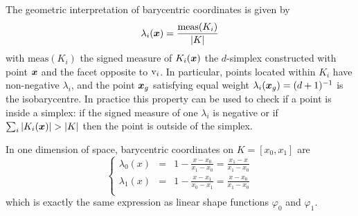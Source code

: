 The geometric interpretation of barycentric coordinates is given by
\[
\displaystyle\lambda_i({{\boldsymbol x}}) = \frac{\mathrm{meas}(K_i)}{|K|}
\]
with $\mathrm{meas}(K_i)$ the signed measure of $K_i({{\boldsymbol x}})$ the $d$-simplex constructed with point ${{\boldsymbol x}}$ and the facet opposite to ${\mathrm v}_i$.
In particular, points located within $K_i$ have non-negative $\lambda_i$, and the point ${{\boldsymbol x}}_g$ satisfying equal weight $\lambda_i({{\boldsymbol x}}_g) = (d+1)^{-1}$ is the isobarycentre.
In practice this property can be used to check if a point is inside a simplex: if the signed measure of one $\lambda_i$ is negative or if $\sum_i |K_i({{\boldsymbol x}})| > |K|$ then the point is outside of the simplex.

\begin{xmpl}
In one dimension of space, barycentric coordinates on $K = [x_0, x_1]$ are
\begin{equation*}
\left\lbrace
\begin{array}{lcl}
\lambda_0(x) &=& 1 - \displaystyle\frac{x - x_0}{x_1 - x_0} = \frac{x_1 - x}{x_1 - x_0}\\[2ex]
\lambda_1(x) &=& 1 - \displaystyle\frac{x - x_1}{x_0 - x_1} = \frac{x - x_0}{x_1 - x_0}\\
\end{array}
\right.
\end{equation*}
which is exactly the same expression as linear shape functions $\varphi_0$ and $\varphi_1$.
\end{xmpl}

